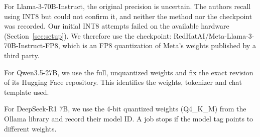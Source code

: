 \par\medskip

For Llama-3-70B-Instruct, the original precision is uncertain. The authors recall using INT8 but could not confirm it, and neither the method nor the checkpoint was recorded. Our initial INT8 attempts failed on the available hardware (Section~\ref{sec:setup}). We therefore use the checkpoint: RedHatAI/Meta-Llama-3-70B-Instruct-FP8, which is an FP8 quantization of Meta's weights published by a third party.

\par\medskip

For Qwen3.5-27B, we use the full, unquantized weights and fix the exact
revision of its Hugging Face repository. This identifies the weights,
tokenizer and chat template used. 

\par\medskip

For DeepSeek-R1 7B, we use the 4-bit
quantized weights (Q4\_K\_M) from the Ollama library and record their
model ID. A job stops if the model tag points to different weights.



